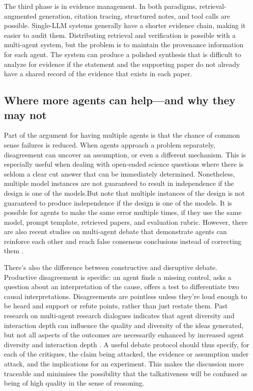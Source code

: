\documentclass[acmsmall,screen,review]{acmart}
\begin{document}
The third phase is in evidence management. In both paradigms, retrieval-augmented generation, citation tracing, structured notes, and tool calls are possible. Single-LLM systems generally have a shorter evidence chain, making it easier to audit them. Distributing retrieval and verification is possible with a multi-agent system, but the problem is to maintain the provenance information for each agent. The system can produce a polished synthesis that is difficult to analyze for evidence if the statement and the supporting paper do not already have a shared record of the evidence that exists in each paper.



\subsection{Where more agents can help---and why they may not}
\label{subsec:agents-benefits-limitations}

Part of the argument for having multiple agents is that the chance of common sense failures is reduced. When agents approach a problem separately, disagreement can uncover an assumption, or even a different mechanism. This is especially useful when dealing with open-ended science questions where there is seldom a clear cut answer that can be immediately determined. Nonetheless, multiple model instances are not guaranteed to result in independence if the design is one of the models.But note that multiple instances of the design is not guaranteed to produce independence if the design is one of the models. It is possible for agents to make the same error multiple times, if they use the same model, prompt template, retrieved papers, and evaluation rubric. However, there are also recent studies on multi-agent debate that demonstrate agents can reinforce each other and reach false consensus conclusions instead of correcting them \cite{choi2025debatevote}.

There's also the difference between constructive and disruptive debate. Productive disagreement is specific: an agent finds a missing control, asks a question about an interpretation of the cause, offers a test to differentiate two causal interpretations. Disagreements are pointless unless they're loud enough to be heard and support or refute points, rather than just restate them. Past research on multi-agent research dialogues indicates that agent diversity and interaction depth can influence the quality and diversity of the ideas generated, but not all aspects of the outcomes are necessarily enhanced by increased agent diversity and interaction depth \cite{ueda2025design}. A useful debate protocol should thus specify, for each of the critiques, the claim being attacked, the evidence or assumption under attack, and the implications for an experiment. This makes the discussion more traceable and minimises the possibility that the talkativeness will be confused as being of high quality in the sense of reasoning.
\end{document}
